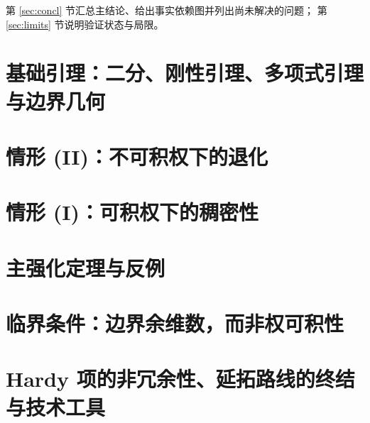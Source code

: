 \noindent
第 \ref{sec:concl} 节汇总主结论、给出事实依赖图并列出尚未解决的问题；
第 \ref{sec:limits} 节说明验证状态与局限。

\section{基础引理：二分、刚性引理、多项式引理与边界几何}\label{sec:part1}


\section{情形 (II)：不可积权下的退化}\label{sec:part2}


\section{情形 (I)：可积权下的稠密性}\label{sec:part3}


\section{主强化定理与反例}\label{sec:part4}


\section{临界条件：边界余维数，而非权可积性}\label{sec:part5}


\section{Hardy 项的非冗余性、延拓路线的终结与技术工具}\label{sec:part6}


